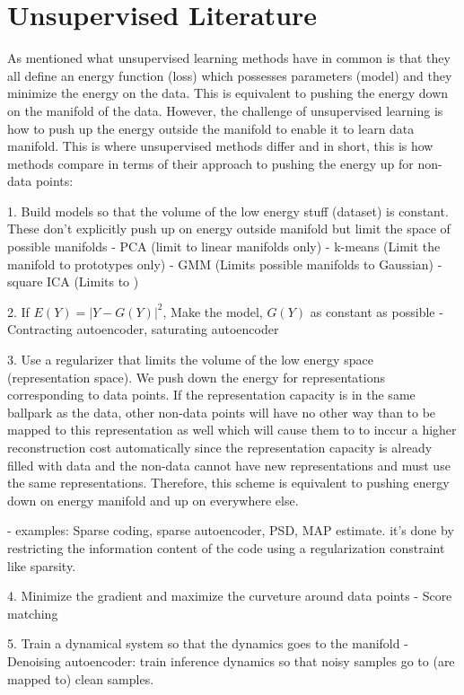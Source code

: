 \documentclass[aps,preprint,showpacs,superscriptaddress,groupedaddress]{revtex4}  %
\begin{document}
\section{Unsupervised Literature}
As mentioned what unsupervised learning methods have in common is that they all define an energy function (loss) which possesses parameters (model) and they minimize the energy on the data. This is equivalent to pushing the energy down on the manifold of the data. However, the challenge of unsupervised learning is how to push up the energy outside the manifold to enable it to learn data manifold. This is where unsupervised methods differ and in short, this is how methods compare in terms of their approach to pushing the energy up for non-data points:

1. Build models so that the volume of the low energy stuff (dataset) is constant. These don't explicitly push up on energy outside manifold but limit the space of possible manifolds 
- PCA (limit to linear manifolds only)
- k-means (Limit the manifold to prototypes only) 
- GMM (Limits possible manifolds to Gaussian)
- square ICA (Limits to )

2. If $E(Y)=|Y-G(Y)|^2$, Make the model, $G(Y)$ as constant as possible 
- Contracting autoencoder, saturating autoencoder

3. Use a regularizer that limits the volume of the low energy space (representation space). We push down the energy for representations corresponding to data points. If the representation capacity is in the same ballpark as the data, other non-data points will have no other way than to be mapped to this representation as well which will cause them to to inccur a higher reconstruction cost automatically since the representation capacity is already filled with data and the non-data cannot have new representations and must use the same representations. Therefore, this scheme is equivalent to pushing energy down on energy manifold and up on everywhere else. 

- examples: Sparse coding, sparse autoencoder, PSD, MAP estimate. it's done by restricting the information content of the code using a regularization constraint like sparsity. 

4. Minimize the gradient and maximize the curveture around data points
- Score matching

5. Train a dynamical system so that the dynamics goes to the manifold
- Denoising autoencoder: train inference dynamics so that noisy samples go to (are mapped to) clean samples. 
\end{document}
